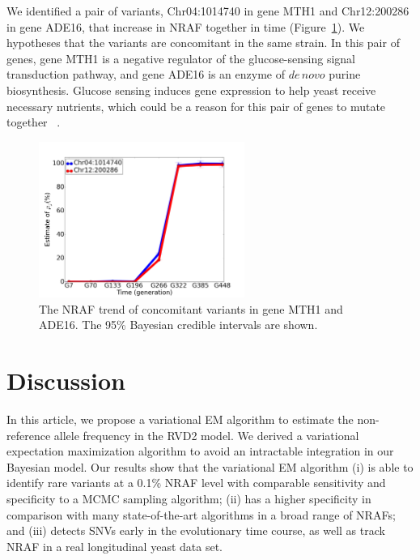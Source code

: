 \documentclass[11pt,reqno]{amsart}
\begin{document}
We identified a pair of variants, Chr04:1014740 in gene MTH1 and Chr12:200286 in gene ADE16, that increase in NRAF together in time (Figure~\ref{tbl:concomitant}).
We hypotheses that the variants are concomitant in the same strain.
In this pair of genes, gene MTH1 is a negative regulator of the glucose-sensing signal transduction pathway, and gene ADE16 is an enzyme of $\mathit{de\, novo}$ purine biosynthesis.
Glucose sensing induces gene expression to help yeast receive necessary nutrients, which could be a reason for this pair of genes to mutate together ~\citep{johnston1999feasting}.
\begin{figure}[htbp]
\centering
\includegraphics[width=0.6\textwidth]{figs/concomitant.png}
\caption{The NRAF trend of concomitant variants in gene MTH1 and ADE16.
The 95\% Bayesian credible intervals are shown.}
\label{tbl:concomitant}
\end{figure}
\section{Discussion}
In this article, we propose a variational EM algorithm to estimate the non-reference allele frequency in the RVD2 model.
We derived a variational expectation maximization algorithm to avoid an intractable integration in our Bayesian model.
Our results show that the variational EM algorithm
(i) is able to identify rare variants at a 0.1\% NRAF level with comparable sensitivity and specificity to a MCMC sampling algorithm;
(ii) has a higher specificity in comparison with many state-of-the-art algorithms in a broad range of NRAFs;
and (iii) detects SNVs early in the evolutionary time course, as well as track NRAF in a real longitudinal yeast data set.
\end{document}
